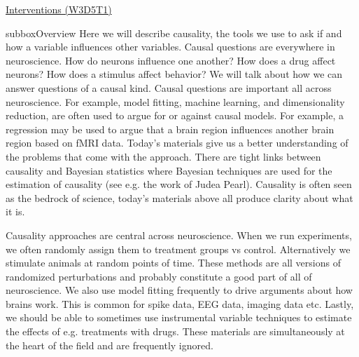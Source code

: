 \begin{textbox}{\href{https://compneuro.neuromatch.io/tutorials/W3D5_NetworkCausality/student/W3D5_Tutorial1.html}{Interventions (W3D5T1)}   }
\begin{subbox}{subbox}{Overview}
\scriptsize
Here we will describe causality, the tools we use to ask if and how a variable influences other variables. Causal questions are everywhere in neuroscience. How do neurons influence one another? How does a drug affect neurons? How does a stimulus affect behavior? We will talk about how we can answer questions of a causal kind. 
Causal questions are important all across neuroscience. For example, model fitting, machine learning, and dimensionality reduction, are often used to argue for or against causal models. For example, a regression may be used to argue that a brain region influences another brain region based on fMRI data. Today’s materials give us a better understanding of the problems that come with the approach. There are tight links between causality and Bayesian statistics where Bayesian techniques are used for the estimation of causality (see e.g. the work of Judea Pearl). Causality is often seen as the bedrock of science, today’s materials above all produce clarity about what it is.

Causality approaches are central across neuroscience. When we run experiments, we often randomly assign them to treatment groups vs control. Alternatively we stimulate animals at random points of time. These methods are all versions of randomized perturbations  and probably constitute a good part of all of neuroscience. We also use model fitting  frequently to drive arguments about how brains work. This is common for spike data, EEG data, imaging data etc. Lastly, we should be able to sometimes use instrumental variable techniques to estimate the effects of e.g. treatments with drugs. These materials are simultaneously at the heart of the field and are frequently ignored.

\end{subbox}
\end{textbox}
